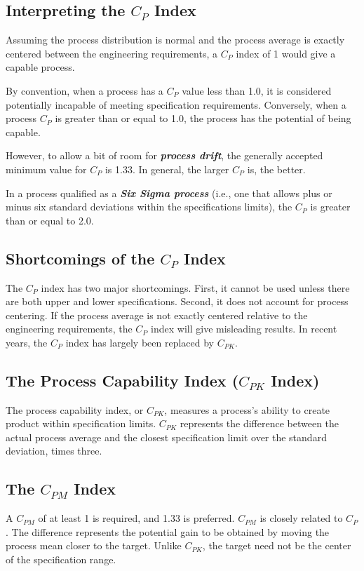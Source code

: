 \documentclass[12pt]{article}
\begin{document}
\subsection*{Interpreting the $C_P$ Index}
Assuming the process distribution is normal and the process average is exactly centered between the engineering requirements, a $C_P$ index of 1 would give a capable process. 

By convention, when a process has a $C_P$ value less than 1.0, it is considered potentially incapable of meeting specification requirements. Conversely, when a process $C_P$ is greater than or equal to 1.0, the process has the potential of being capable.

However, to allow a bit of room for \textit{\textbf{process drift}}, the generally accepted minimum value for $C_P$ is 1.33. In general, the larger $C_P$ is, the better. 

In a process qualified as a \textit{\textbf{Six Sigma process}} (i.e., one that allows plus or minus six standard deviations within the specifications limits), the $C_P$ is greater than or equal to 2.0.

\subsection*{Shortcomings of the $C_P$ Index}
The $C_P$ index has two major shortcomings. First, it cannot be used unless there are both upper and lower specifications. Second, it does not account for process centering. If the process average is not exactly centered relative to the engineering requirements, the $C_P$ index will give misleading results. In recent years, the $C_P$ index has largely been replaced by $C_{PK}$.

\subsection*{The Process Capability Index ($C_{PK}$ Index)}
The process capability index, or $C_{PK}$, measures a process's ability to create product within specification limits. $C_{PK}$ represents the difference between the actual process average and the closest specification limit over the standard deviation, times three.

\subsection*{The $C_{PM}$ Index}

A $C_{PM}$ of at least 1 is required, and 1.33 is preferred. $C_{PM}$ is closely related to $C_{P}$. The difference represents the potential gain to be obtained by moving the process mean closer to the target. Unlike $C_{PK}$, the target need not be the center of the specification range.
\end{document}
